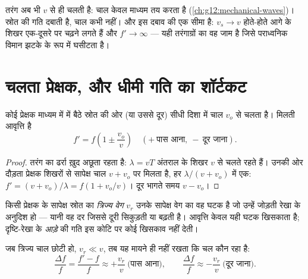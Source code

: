 \begin{remark}[गति किसे नहीं बदलती]\label{rem:g12:doppler-effect:speed-unchanged}
तरंग अब भी $v$ से ही चलती है: चाल केवल माध्यम तय करता है (\cref{ch:g12:mechanical-waves})।
स्रोत की गति \emph{} दबाती है, चाल कभी नहीं। और इस दबाव की
एक सीमा है: $v_s \to v$ होते-होते आगे के शिखर एक-दूसरे पर चढ़ने लगते हैं और $f' \to \infty$
--- यही तरंगाग्रों का वह जाम है जिसे पराध्वनिक विमान झटके के रूप में
घसीटता है।
\end{remark}

\section{चलता प्रेक्षक, और धीमी गति का शॉर्टकट}

\begin{proposition}[चलता प्रेक्षक]\label{prop:g12:doppler-effect:moving-observer}
कोई प्रेक्षक माध्यम में  में बैठे स्रोत की ओर (या उससे दूर) सीधी दिशा में
चाल $v_o$ से चलता है। मिलती आवृत्ति है
\[ f' = f\left(1 \pm \frac{v_o}{v}\right) \quad (+\ \text{पास आना},\ -\ \text{दूर जाना}). \]
\end{proposition}

\begin{proof}
तरंग का ढर्रा ख़ुद अछूता रहता है: $\lambda = vT$ अंतराल के शिखर $v$ से चलते
रहते हैं। उनकी ओर दौड़ता प्रेक्षक शिखरों से सापेक्ष चाल $v + v_o$ पर मिलता है,
हर $\lambda/(v + v_o)$  में एक: $f' = (v + v_o)/\lambda = f(1 + v_o/v)$। दूर भागते समय $v - v_o$।
\end{proof}

\begin{definition}[त्रिज्य वेग]\label{def:g12:doppler-effect:radial}
किसी प्रेक्षक के सापेक्ष स्रोत का \emph{त्रिज्य वेग}
$v_r$ उनके सापेक्ष वेग का वह घटक है जो उन्हें जोड़ती रेखा के अनुदिश हो ---
यानी वह दर जिससे दूरी सिकुड़ती या बढ़ती है। आवृत्ति केवल यही घटक
खिसकाता है; दृष्टि-रेखा के \emph{आड़े} की गति इस कोटि पर कोई खिसकाव नहीं
देती।
\end{definition}

\begin{proposition}[धीमी गति: सबके लिए एक ही सूत्र]\label{prop:g12:doppler-effect:slow}
जब त्रिज्य चाल छोटी हो, $v_r \ll v$, तब यह मायने ही नहीं रखता कि चल कौन रहा है:
\[
\frac{\Delta f}{f} = \frac{f' - f}{f} \approx +\frac{v_r}{v} \ \text{(पास आना)},
\qquad
\frac{\Delta f}{f} \approx -\frac{v_r}{v} \ \text{(दूर जाना)}.
\]
\end{proposition}

